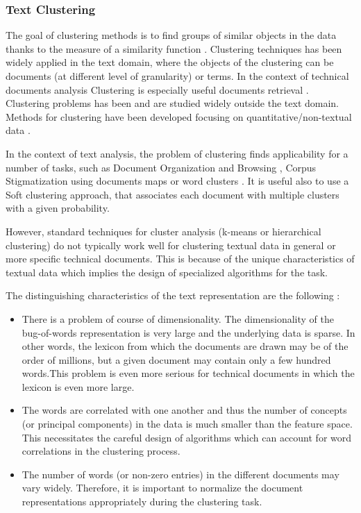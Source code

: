 \documentclass[]{book}
\begin{document}
\subsubsection{Text Clustering}\label{sotatoolsmodelnetanal}

The goal of clustering methods is to find groups of similar objects in
the data thanks to the measure of a similarity function
\citep[\citet{kaufman2009finding}]{jain1988algorithms}. Clustering
techniques has been widely applied in the text domain, where the objects
of the clustering can be documents (at different level of granularity)
or terms. In the context of technical documents analysis Clustering is
especially useful documents retrieval
\citep[\citet{cutting1993constant}]{anick1997exploiting}. Clustering
problems has been and are studied widely outside the text domain.
Methods for clustering have been developed focusing on
quantitative/non-textual data \citep[\citet{han2001spatial},
\citet{zhang1996birch}]{guha1998cure}.

In the context of text analysis, the problem of clustering finds
applicability for a number of tasks, such as Document Organization and
Browsing \citep{cutting2017scatter}, Corpus Stigmatization using
documents maps \citep{schutze1997projections} or word clusters
\citep[\citet{bekkerman2001feature}]{baker1998distributional}. It is
useful also to use a Soft clustering approach, that associates each
document with multiple clusters with a given probability.

However, standard techniques for cluster analysis (k-means or
hierarchical clustering) do not typically work well for clustering
textual data in general or more specific technical documents. This is
because of the unique characteristics of textual data which implies the
design of specialized algorithms for the task.

The distinguishing characteristics of the text representation are the
following \citep{aggarwal2012survey}:

\begin{itemize}
\item
  There is a problem of course of dimensionality. The dimensionality of
  the bug-of-words representation is very large and the underlying data
  is sparse. In other words, the lexicon from which the documents are
  drawn may be of the order of millions, but a given document may
  contain only a few hundred words.This problem is even more serious for
  technical documents in which the lexicon is even more large.
\item
  The words are correlated with one another and thus the number of
  concepts (or principal components) in the data is much smaller than
  the feature space. This necessitates the careful design of algorithms
  which can account for word correlations in the clustering process.
\item
  The number of words (or non-zero entries) in the different documents
  may vary widely. Therefore, it is important to normalize the document
  representations appropriately during the clustering task.
\end{itemize}
\end{document}
